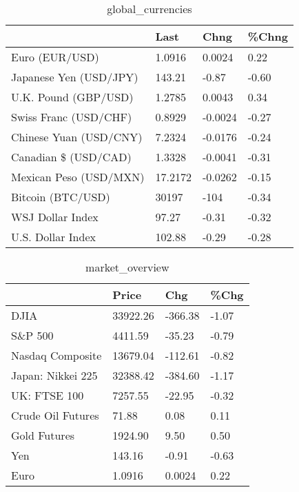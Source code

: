 \documentclass{article}%
\begin{document}
%


\begin{table}[htbp]%
\caption{global\_currencies}%
\centering%
\begin{adjustbox}{width=1\textwidth}%
\begin{tabular}{llll}
\toprule
                       &    Last &    Chng & \%Chng \\
\midrule
        Euro (EUR/USD) &  1.0916 &  0.0024 &  0.22 \\
Japanese Yen (USD/JPY) &  143.21 &   -0.87 & -0.60 \\
  U.K. Pound (GBP/USD) &  1.2785 &  0.0043 &  0.34 \\
 Swiss Franc (USD/CHF) &  0.8929 & -0.0024 & -0.27 \\
Chinese Yuan (USD/CNY) &  7.2324 & -0.0176 & -0.24 \\
  Canadian \$ (USD/CAD) &  1.3328 & -0.0041 & -0.31 \\
Mexican Peso (USD/MXN) & 17.2172 & -0.0262 & -0.15 \\
     Bitcoin (BTC/USD) &   30197 &    -104 & -0.34 \\
      WSJ Dollar Index &   97.27 &   -0.31 & -0.32 \\
     U.S. Dollar Index &  102.88 &   -0.29 & -0.28 \\
\bottomrule
\end{tabular}
%
\end{adjustbox}%
\end{table}

%


\begin{table}[htbp]%
\caption{market\_overview}%
\centering%
\begin{adjustbox}{width=1\textwidth}%
\begin{tabular}{llll}
\toprule
                  &    Price &     Chg &  \%Chg \\
\midrule
             DJIA & 33922.26 & -366.38 & -1.07 \\
          S\&P 500 &  4411.59 &  -35.23 & -0.79 \\
 Nasdaq Composite & 13679.04 & -112.61 & -0.82 \\
Japan: Nikkei 225 & 32388.42 & -384.60 & -1.17 \\
     UK: FTSE 100 &  7257.55 &  -22.95 & -0.32 \\
Crude Oil Futures &    71.88 &    0.08 &  0.11 \\
     Gold Futures &  1924.90 &    9.50 &  0.50 \\
              Yen &   143.16 &   -0.91 & -0.63 \\
             Euro &   1.0916 &  0.0024 &  0.22 \\
\bottomrule
\end{tabular}
%
\end{adjustbox}%
\end{table}

%
\end{document}
